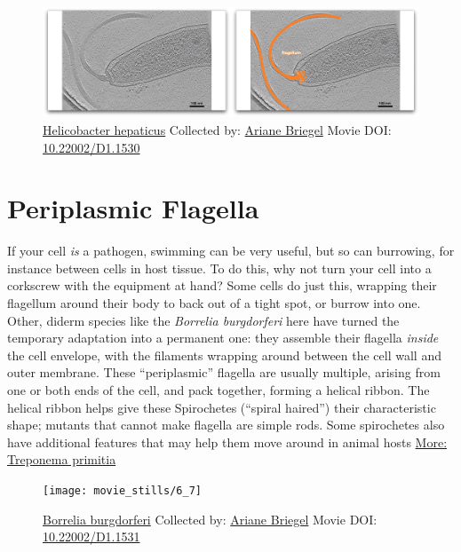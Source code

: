 \documentclass[]{tufte-book}
\begin{document}
\begin{figure}
\includegraphics{movie_stills/6_6} \caption[\protect\hyperlink{tree}{Helicobacter hepaticus} Collected by:
\protect\hyperlink{ariane_briegel}{Ariane Briegel} Movie DOI:
\href{https://doi.org/10.22002/D1.1530}{10.22002/D1.1530}]{\protect\hyperlink{tree}{Helicobacter hepaticus} Collected by:
\protect\hyperlink{ariane_briegel}{Ariane Briegel} Movie DOI:
\href{https://doi.org/10.22002/D1.1530}{10.22002/D1.1530}}\label{fig:6-6}
\end{figure}

\section{Periplasmic Flagella}\label{periplasmic-flagella}

If your cell \emph{is} a pathogen, swimming can be very useful, but so
can burrowing, for instance between cells in host tissue. To do this,
why not turn your cell into a corkscrew with the equipment at hand? Some
cells do just this, wrapping their flagellum around their body to back
out of a tight spot, or burrow into one. Other, diderm species like the
\emph{Borrelia burgdorferi} here have turned the temporary adaptation
into a permanent one: they assemble their flagella \emph{inside} the
cell envelope, with the filaments wrapping around between the cell wall
and outer membrane. These ``periplasmic'' flagella are usually multiple,
arising from one or both ends of the cell, and pack together, forming a
helical ribbon. The helical ribbon helps give these Spirochetes
(``spiral haired'') their characteristic shape; mutants that cannot make
flagella are simple rods. Some spirochetes also have additional features
that may help them move around in animal hosts
\protect\hyperlink{Treponema_primitia}{More: Treponema primitia}





\begin{figure}
\texttt{[image: movie\_stills/6\_7]} \caption[\protect\hyperlink{tree}{Borrelia burgdorferi} Collected by:
\protect\hyperlink{ariane_briegel}{Ariane Briegel} Movie DOI:
\href{https://doi.org/10.22002/D1.1531}{10.22002/D1.1531}]{\protect\hyperlink{tree}{Borrelia burgdorferi} Collected by:
\protect\hyperlink{ariane_briegel}{Ariane Briegel} Movie DOI:
\href{https://doi.org/10.22002/D1.1531}{10.22002/D1.1531}}\label{fig:6-7}
\end{figure}
\end{document}
